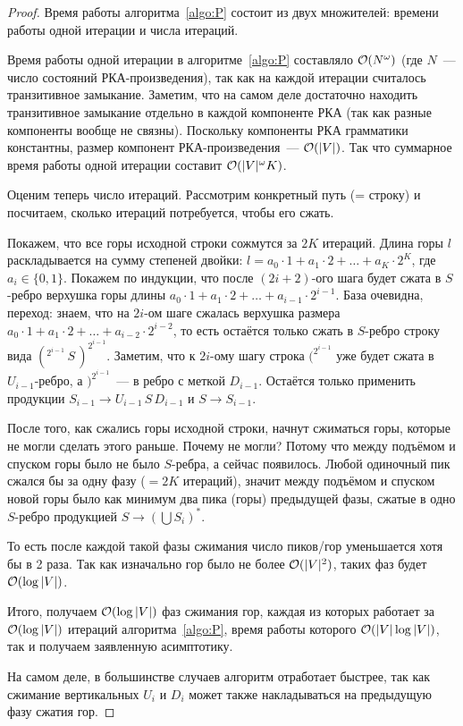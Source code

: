 \begin{proof}
  Время работы алгоритма~\ref{algo:P} состоит из двух множителей: времени работы одной итерации и числа итераций.

  Время работы одной итерации в алгоритме~\ref{algo:P} составляло $\mathcal{O}(N^{\omega})$ (где $N$~--- число состояний РКА-произведения), так как на каждой итерации считалось транзитивное замыкание. Заметим, что на самом деле достаточно находить транзитивное замыкание отдельно в каждой компоненте РКА (так как разные компоненты вообще не связны). Поскольку компоненты РКА грамматики константны, размер компонент РКА-произведения~--- $\mathcal{O}(|V|)$. Так что суммарное время работы одной итерации составит $\mathcal{O}(|V|^{\omega} K)$.

  Оценим теперь число итераций. Рассмотрим конкретный путь (= строку) и посчитаем, сколько итераций потребуется, чтобы его сжать.

  Покажем, что все горы исходной строки сожмутся за $2K$ итераций. Длина горы $l$ раскладывается на сумму степеней двойки: $l = a_0 \cdot 1 + a_1 \cdot 2 + \dots + a_K \cdot 2^{K}$, где $a_i \in \{0, 1\}$. Покажем по индукции, что после $(2i+2)$-ого шага будет сжата в $S$-ребро верхушка горы длины $a_0 \cdot 1 + a_1 \cdot 2 + \dots + a_{i-1} \cdot 2^{i-1}$. База очевидна, переход: знаем, что на $2i$-ом шаге сжалась верхушка размера $a_0 \cdot 1 + a_1 \cdot 2 + \dots + a_{i-2} \cdot 2^{i-2}$, то есть остаётся только сжать в $S$-ребро строку вида $(^{2^{i-1}} \, S \, )^{2^{i-1}}$. Заметим, что к $2i$-ому шагу строка $(^{2^{i-1}}$ уже будет сжата в $U_{i-1}$-ребро, а $)^{2^{i-1}}$~--- в ребро с меткой $D_{i-1}$. Остаётся только применить продукции $S_{i-1} \to U_{i-1} \, S \, D_{i-1}$ и $S \to S_{i-1}$.

  После того, как сжались горы исходной строки, начнут сжиматься горы, которые не могли сделать этого раньше. Почему не могли? Потому что между подъёмом и спуском горы было не было $S$-ребра, а сейчас появилось. Любой одиночный пик сжался бы за одну фазу ($= 2K$ итераций), значит между подъёмом и спуском новой горы было как минимум два пика (горы) предыдущей фазы, сжатые в одно $S$-ребро продукцией $S \to (\bigcup S_i)^{*}$. 

  То есть после каждой такой фазы сжимания число пиков/гор уменьшается хотя бы в 2 раза. Так как изначально гор было не более $\mathcal{O}(|V|^2)$, таких фаз будет $\mathcal{O}(\log |V|)$.

  Итого, получаем $\mathcal{O}(\log |V|)$ фаз сжимания гор, каждая из которых работает за $\mathcal{O}(\log |V|)$ итераций алгоритма~\ref{algo:P}, время работы которого $\mathcal{O}(|V| \log |V|)$, так и получаем заявленную асимптотику.

  На самом деле, в большинстве случаев алгоритм отработает быстрее, так как сжимание вертикальных $U_i$ и $D_i$ может также накладываться на предыдущую фазу сжатия гор.

\end{proof}

